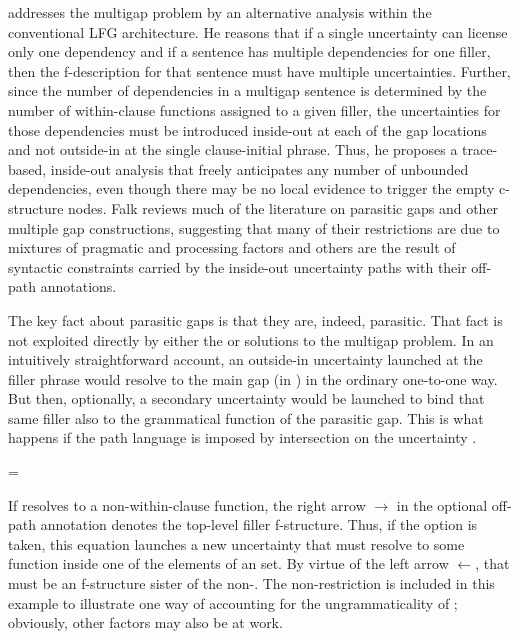\documentclass[output=paper,hidelinks]{langscibook}
\begin{document}
\citet{Falk11} addresses the multigap problem by an alternative analysis within the conventional LFG architecture.  He reasons that if a single uncertainty can license only one dependency and if a sentence has multiple dependencies for one filler, then the f-description for that sentence must have multiple uncertainties.  Further, since the number of dependencies in a multigap sentence is determined by the number of within-clause functions assigned to a given filler, the uncertainties for those dependencies must be introduced inside-out at each of the gap locations and not outside-in at the single clause-initial phrase.  Thus, he proposes a trace-based, inside-out analysis that freely anticipates any number of unbounded dependencies, even though there may be no local evidence to trigger the empty c-structure nodes.  Falk reviews much of the literature on parasitic gaps and other multiple gap constructions, suggesting that many of their restrictions are due to mixtures of pragmatic and processing factors and others are the result of syntactic constraints carried by the inside-out uncertainty paths with their off-path annotations.

The key fact about parasitic gaps is that they are, indeed, parasitic. That fact is not exploited directly by either the \citet{alsina2008} or \citet{Falk11} solutions to the multigap problem.   In an intuitively straightforward account, an outside-in uncertainty launched at the filler phrase would resolve to the main gap (\OBJ in ) in the ordinary one-to-one way.  But then, optionally, a secondary uncertainty would be launched to bind that same filler also to the grammatical function of the parasitic gap.  This is what happens if the  path language  is imposed by intersection on the  uncertainty .

\ea\label{para}
\ea\label{para1}
     = \kstar {}
\ex\label{para2}
\z\z

\largerpage
\noindent If  resolves to a non-\SUBJ within-clause function, the right arrow $\rightarrow$ in the optional off-path annotation denotes the top-level filler f-structure.  Thus, if the option is taken, this equation launches a new uncertainty that must resolve to some function inside one of the elements of an \ADJ set.  By virtue of the left arrow $\leftarrow$, that \ADJ must be an f-structure sister of the non-\SUBJ.  The non-\SUBJ restriction is included in this example to illustrate one way of accounting for the ungrammaticality of ; obviously, other factors may also be at work.
\end{document}

